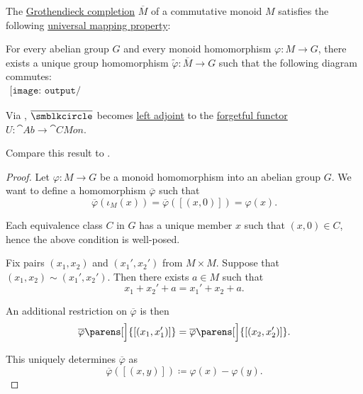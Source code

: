 \begin{proposition}\label{thm:monoid_grothendieck_completion_universal_property}
  The \hyperref[def:monoid_grothendieck_completion]{Grothendieck completion} \( \overline{M} \) of a commutative monoid \( M \) satisfies the following \hyperref[rem:universal_mapping_property]{universal mapping property}:
  \begin{displayquote}
    For every abelian group \( G \) and every monoid homomorphism \( \varphi: M \to G \), there exists a unique group homomorphism \( \widetilde{\varphi}: \overline{M} \to G \) such that the following diagram commutes:
    \begin{equation}\label{eq:thm:monoid_grothendieck_completion_universal_property/diagram}
      \begin{aligned}
        \texttt{[image: output/thm\_\_monoid\_grothendieck\_completion\_universal\_property.pdf]}
      \end{aligned}
    \end{equation}
  \end{displayquote}

  Via , \( \overline{\anon} \) becomes \hyperref[def:category_adjunction]{left adjoint} to the \hyperref[def:concrete_category]{forgetful functor} \( U: \cat{Ab} \to \cat{CMon} \).

  Compare this result to .
\end{proposition}
\begin{proof}
  Let \( \varphi: M \to G \) be a monoid homomorphism into an abelian group \( G \). We want to define a homomorphism \( \overline{\varphi} \) such that
  \begin{equation*}
    \overline{\varphi}(\iota_M(x)) = \overline{\varphi}([(x, 0)]) = \varphi(x).
  \end{equation*}

  Each equivalence class \( C \) in \( G \) has a unique member \( x \) such that \( (x, 0) \in C \), hence the above condition is well-posed.

  Fix pairs \( (x_1, x_2) \) and \( (x_1', x_2') \) from \( M \times M \). Suppose that \( (x_1, x_2) \sim (x_1', x_2') \). Then there exists \( a \in M \) such that
  \begin{equation*}
    x_1 + x_2' + a = x_1' + x_2 + a.
  \end{equation*}

  An additional restriction on \( \overline{\varphi} \) is then
  \begin{equation*}
    \overline{\varphi}\parens[\Big]{ [(x_1, x_1')] }
    =
    \overline{\varphi}\parens[\Big]{ [(x_2, x_2')] }.
  \end{equation*}

  This uniquely determines \( \overline{\varphi} \) as
  \begin{equation*}
    \overline{\varphi}([(x, y)]) \coloneqq \varphi(x) - \varphi(y).
  \end{equation*}
\end{proof}

